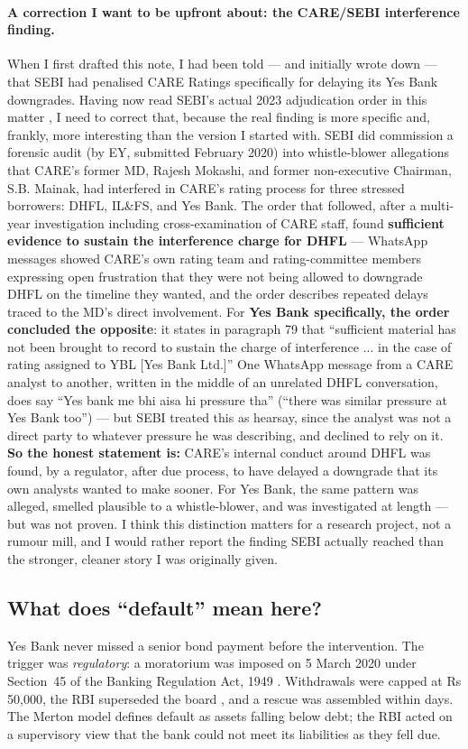 \paragraph{A correction I want to be upfront about: the CARE/SEBI interference finding.} When I first drafted this note, I had been told — and initially wrote down — that SEBI had penalised CARE Ratings specifically for delaying its Yes Bank downgrades. Having now read SEBI's actual 2023 adjudication order in this matter \cite{sebiCareOrder}, I need to correct that, because the real finding is more specific and, frankly, more interesting than the version I started with. SEBI did commission a forensic audit (by EY, submitted February 2020) into whistle-blower allegations that CARE's former MD, Rajesh Mokashi, and former non-executive Chairman, S.B. Mainak, had interfered in CARE's rating process for three stressed borrowers: DHFL, IL\&FS, and Yes Bank. The order that followed, after a multi-year investigation including cross-examination of CARE staff, found \textbf{sufficient evidence to sustain the interference charge for DHFL} — WhatsApp messages showed CARE's own rating team and rating-committee members expressing open frustration that they were not being allowed to downgrade DHFL on the timeline they wanted, and the order describes repeated delays traced to the MD's direct involvement. For \textbf{Yes Bank specifically, the order concluded the opposite}: it states in paragraph 79 that ``sufficient material has not been brought to record to sustain the charge of interference ... in the case of rating assigned to YBL [Yes Bank Ltd.]'' One WhatsApp message from a CARE analyst to another, written in the middle of an unrelated DHFL conversation, does say ``Yes bank me bhi aisa hi pressure tha'' (``there was similar pressure at Yes Bank too'') — but SEBI treated this as hearsay, since the analyst was not a direct party to whatever pressure he was describing, and declined to rely on it. \textbf{So the honest statement is:} CARE's internal conduct around DHFL was found, by a regulator, after due process, to have delayed a downgrade that its own analysts wanted to make sooner. For Yes Bank, the same pattern was alleged, smelled plausible to a whistle-blower, and was investigated at length — but was not proven. I think this distinction matters for a research project, not a rumour mill, and I would rather report the finding SEBI actually reached than the stronger, cleaner story I was originally given.

\subsection{What does ``default'' mean here?}
Yes Bank never missed a senior bond payment before the intervention. The trigger was \emph{regulatory}: a moratorium was imposed on 5 March 2020 under Section~45 of the Banking Regulation Act, 1949 \cite{crisilMar20}. Withdrawals were capped at Rs 50,000, the RBI superseded the board \cite{btQ3}, and a rescue was assembled within days. The Merton model defines default as assets falling below debt; the RBI acted on a supervisory view that the bank could not meet its liabilities as they fell due.

